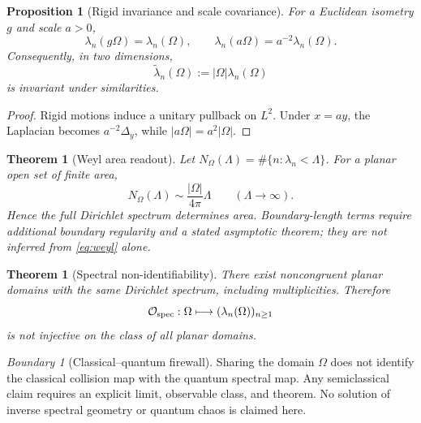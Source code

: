 \documentclass[11pt,a4paper]{article}
\theoremstyle{definition}
\theoremstyle{plain}
\newtheorem{theorem}[definition]{Theorem}
\newtheorem{proposition}[definition]{Proposition}
\theoremstyle{remark}
\newtheorem{warning}[definition]{Boundary}
\newcommand{\Ocal}{\mathcal O}
\begin{document}
\begin{proposition}[Rigid invariance and scale covariance]
\label{prop:spectral-covariance}
For a Euclidean isometry \(g\) and scale \(a>0\),
\begin{equation}\label{eq:spectral-scaling}
\lambda_n(g\Omega)=\lambda_n(\Omega),\qquad
\lambda_n(a\Omega)=a^{-2}\lambda_n(\Omega).
\end{equation}
Consequently, in two dimensions,
\begin{equation}\label{eq:dimensionless-spectrum}
\widetilde\lambda_n(\Omega):=|\Omega|\lambda_n(\Omega)
\end{equation}
is invariant under similarities.
\end{proposition}

\begin{proof}
Rigid motions induce a unitary pullback on \(L^2\). Under
\(x=ay\), the Laplacian becomes \(a^{-2}\Delta_y\), while
\(|a\Omega|=a^2|\Omega|\).
\end{proof}

\begin{theorem}[Weyl area readout]\label{thm:weyl}
Let \(N_\Omega(\Lambda)=\#\{n:\lambda_n<\Lambda\}\). For a planar open
set of finite area,
\begin{equation}\label{eq:weyl}
N_\Omega(\Lambda)
\sim\frac{|\Omega|}{4\pi}\Lambda
\qquad(\Lambda\to\infty).
\end{equation}
Hence the full Dirichlet spectrum determines area. Boundary-length
terms require additional boundary regularity and a stated asymptotic
theorem; they are not inferred from \cref{eq:weyl} alone.
\end{theorem}

\begin{theorem}[Spectral non-identifiability]\label{thm:isospectral}
There exist noncongruent planar domains with the same Dirichlet
spectrum, including multiplicities. Therefore
\[
\Ocal_{\rm spec}:\Omega\longmapsto(\lambda_n(\Omega))_{n\ge1}
\]
is not injective on the class of all planar domains.
\end{theorem}

\begin{warning}[Classical--quantum firewall]
Sharing the domain \(\Omega\) does not identify the classical
collision map with the quantum spectral map. Any semiclassical claim
requires an explicit limit, observable class, and theorem. No
solution of inverse spectral geometry or quantum chaos is claimed
here.
\end{warning}
\end{document}
